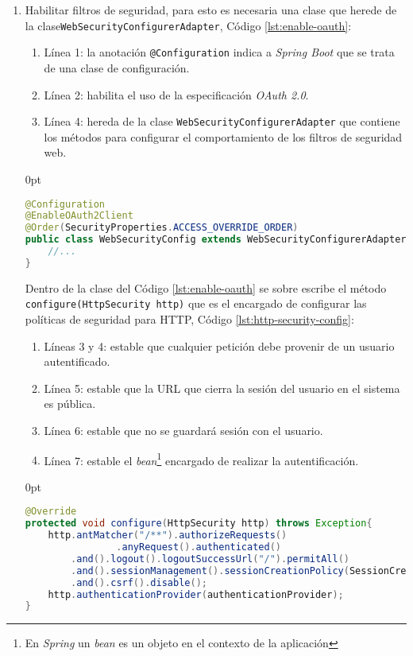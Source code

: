 \begin{enumerate}
	\item Habilitar filtros de seguridad, para esto es necesaria una clase que herede de la clase\linebreak\texttt{WebSecurityConfigurerAdapter}, Código \ref{lst:enable-oauth}:

	\begin{enumerate}
		\item Línea 1: la anotación \texttt{@Configuration} indica a \textit{Spring Boot} que se trata de una clase de configuración.
		\item Línea 2: habilita el uso de la especificación \textit{OAuth 2.0}.
		\item Línea 4: hereda de la clase \texttt{WebSecurityConfigurerAdapter} que contiene los métodos para configurar el comportamiento de los filtros de seguridad web.
	\end{enumerate}

\begin{adjustwidth}{\listingfixwidth}{0pt}
\begin{lstlisting}[language=Java, caption={Clase para habilitar los filtros de seguridad.}, captionpos=b, label={lst:enable-oauth}]
@Configuration
@EnableOAuth2Client
@Order(SecurityProperties.ACCESS_OVERRIDE_ORDER)
public class WebSecurityConfig extends WebSecurityConfigurerAdapter{
	//...
}
\end{lstlisting}
\end{adjustwidth}

	Dentro de la clase del Código \ref{lst:enable-oauth} se sobre escribe el método \texttt{configure(HttpSecurity http)} que es el encargado de configurar las políticas de seguridad para HTTP, Código \ref{lst:http-security-config}:
	\begin{enumerate}
		\item Líneas 3 y 4: estable que cualquier petición debe provenir de un usuario autentificado.
		\item Línea 5: estable que la URL que cierra la sesión del usuario en el sistema es pública.
		\item Línea 6: estable que no se guardará sesión con el usuario.
		\item Línea 7: estable el \textit{bean}\footnote{En \textit{Spring} un \textit{bean} es un objeto en el contexto de la aplicación\cite{SpringInAction}} encargado de realizar la autentificación.
	\end{enumerate}
\begin{adjustwidth}{\listingfixwidth}{0pt}
\begin{lstlisting}[language=Java, caption={Configuración de las políticas de seguridad para HTTP.}, captionpos=b, label={lst:http-security-config}]
@Override
protected void configure(HttpSecurity http) throws Exception{
	http.antMatcher("/**").authorizeRequests()
				.anyRequest().authenticated()
		.and().logout().logoutSuccessUrl("/").permitAll()
		.and().sessionManagement().sessionCreationPolicy(SessionCreationPolicy.STATELESS)
		.and().csrf().disable();
	http.authenticationProvider(authenticationProvider);
}
\end{lstlisting}
\end{adjustwidth}
	

\end{enumerate}
